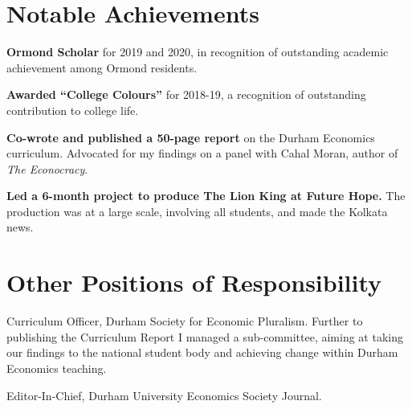 \documentclass[a4]{article}
\renewenvironment{itemize}{
  \begin{list}{}{
    \setlength{\leftmargin}{1.5em}
  }
}{
  \end{list}
}
\begin{document}
\section*{Notable Achievements}
\begin{itemize}
\item \textbf{Ormond Scholar} for 2019 and 2020, in recognition of outstanding academic achievement among Ormond residents.
\item \textbf{Awarded ``College Colours''} for 2018-19, a recognition of outstanding contribution to college life.
\item \textbf{Co-wrote and published a 50-page report} on the Durham Economics curriculum. Advocated for my findings on a panel with Cahal Moran, author of \textit{The Econocracy}.
\item \textbf{Led a 6-month project to produce The Lion King at Future Hope.} The production was at a large scale, involving all students, and made the Kolkata news.
\end{itemize}

\section*{Other Positions of Responsibility}
\begin{itemize}
	\item Curriculum Officer, Durham Society for Economic Pluralism. Further to publishing the Curriculum Report I managed a sub-committee, aiming at taking our findings to the national student body and achieving change within Durham Economics teaching.
\item Editor-In-Chief, Durham University Economics Society Journal.

\end{itemize}

\end{document}
